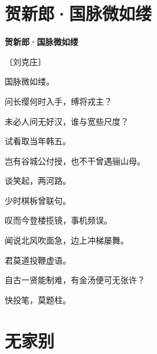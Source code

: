 \documentclass[12pt,UTF-8,openany,fontset=none]{ctexbook}
\begin{document}
\vspace{8pt}
\clearpage

\section{贺新郎·国脉微如缕}


\begin{center}
    {\bfseries 贺新郎·国脉微如缕}

    \vspace{18pt}

    \begin{large}\xuwen
        〔刘克庄〕
    \end{large}

\end{center}

    \vspace{18pt}  %

\begin{center}
    \begin{Large}

        国脉微如缕。

        问长缨何时入手，缚将戎主？

        未必人间无好汉，谁与宽些尺度？

        试看取当年韩五。

        岂有谷城公付授，也不干曾遇骊山母。

        谈笑起，两河路。

        \vspace{18pt}  %

        少时棋柝曾联句。

        叹而今登楼揽镜，事机频误。

        闻说北风吹面急，边上冲梯屡舞。

        君莫道投鞭虚语。

        自古一贤能制难，有金汤便可无张许？

        快投笔，莫题柱。

    \end{Large}

\end{center}

\vspace{8pt}
\clearpage

\section{无家别}
\end{document}
